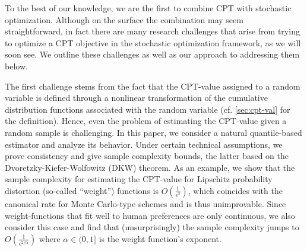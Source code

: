 To the  best of our knowledge, we are the first to combine CPT with stochastic optimization. Although on the surface the combination may seem straightforward, in fact there are many research challenges that arise from trying to optimize a CPT objective in the stochastic optimization framework, as we will soon see. 
We outline these challenges as well as our approach to addressing them below. 

The first challenge stems from the fact that the CPT-value assigned to a random variable is defined through a nonlinear transformation of the cumulative distribution functions associated with the random variable (cf. \cref{sec:cpt-val} for the definition). 
Hence, even the problem of estimating the CPT-value given a random sample is challenging.
In this paper, we consider a natural quantile-based estimator and analyze its behavior.
Under certain technical assumptions, we prove consistency and give sample complexity bounds, the latter based on the
 Dvoretzky-Kiefer-Wolfowitz (DKW) theorem.
As an example, we show that the sample complexity for estimating the CPT-value 
for Lipschitz probability distortion (so-called ``weight'') functions is  $O\left(\frac1{\epsilon^2}\right)$, which coincides with the canonical rate for Monte Carlo-type schemes and is thus unimprovable. Since weight-functions that fit well to human preferences are only  \holder continuous, we also consider this case and find that (unsurprisingly) the sample complexity  jumps to $O\left(\frac1{\epsilon^{2/\alpha}}\right)$ where $\alpha\in (0,1]$ is the weight function's \holder exponent.


